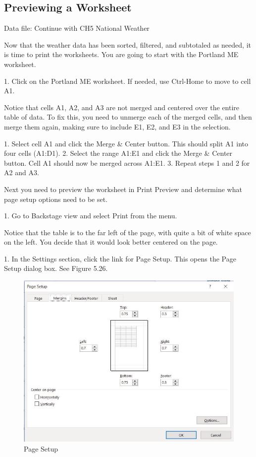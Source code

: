 \subsection{Previewing a Worksheet}

Data file: Continue with CH5 National Weather

Now that the weather data has been sorted, filtered, and subtotaled as needed, it is time to print the
worksheets. You are going to start with the Portland ME worksheet.

1. Click on the Portland ME worksheet. If needed, use Ctrl-Home to move to cell A1.

Notice that cells A1, A2, and A3 are not merged and centered over the entire table of data. To fix this,
you need to unmerge each of the merged cells, and then merge them again, making sure to include E1,
E2, and E3 in the selection.

1. Select cell A1 and click the Merge \& Center button. This should split A1 into four cells (A1:D1).
2. Select the range A1:E1 and click the Merge \& Center button. Cell A1 should now be merged
across A1:E1.
3. Repeat steps 1 and 2 for A2 and A3.

Next you need to preview the worksheet in Print Preview and determine what page setup options
need to be set.

1. Go to Backstage view and select Print from the menu.

Notice that the table is to the far left of the page, with quite a bit of white space on the left. You decide
that it would look better centered on the page.




1. In the Settings section, click the link for Page Setup. This opens the Page Setup dialog box. See
Figure 5.26.


\begin{figure}[H]
	\centering
	\includegraphics[width=\maxwidth{.95\linewidth}]{gfx/ch05_fig26}
	\caption{Page Setup}
	\label{05:fig26}
\end{figure}





